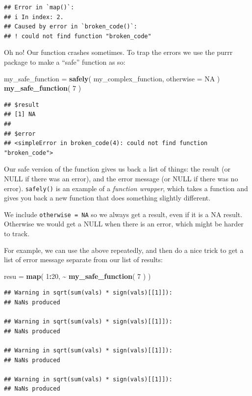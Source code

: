 \documentclass[
]{book}
\newenvironment{Shaded}{\begin{snugshade}}{\end{snugshade}}
\newcommand{\AttributeTok}[1]{\textcolor[rgb]{0.13,0.29,0.53}{#1}}
\newcommand{\ConstantTok}[1]{\textcolor[rgb]{0.56,0.35,0.01}{#1}}
\newcommand{\DecValTok}[1]{\textcolor[rgb]{0.00,0.00,0.81}{#1}}
\newcommand{\FunctionTok}[1]{\textcolor[rgb]{0.13,0.29,0.53}{\textbf{#1}}}
\newcommand{\NormalTok}[1]{#1}
\newcommand{\OtherTok}[1]{\textcolor[rgb]{0.56,0.35,0.01}{#1}}
\newcommand{\SpecialCharTok}[1]{\textcolor[rgb]{0.81,0.36,0.00}{\textbf{#1}}}
\begin{document}
\begin{verbatim}
## Error in `map()`:
## i In index: 2.
## Caused by error in `broken_code()`:
## ! could not find function "broken_code"
\end{verbatim}

Oh no! Our function crashes sometimes.
To trap the errors we use the purrr package to make a ``safe'' function as so:

\begin{Shaded}
\begin{Highlighting}[]
\NormalTok{my\_safe\_function }\OtherTok{=} \FunctionTok{safely}\NormalTok{( my\_complex\_function,}
                           \AttributeTok{otherwise =} \ConstantTok{NA}\NormalTok{ )}
\FunctionTok{my\_safe\_function}\NormalTok{( }\DecValTok{7}\NormalTok{ )}
\end{Highlighting}
\end{Shaded}

\begin{verbatim}
## $result
## [1] NA
## 
## $error
## <simpleError in broken_code(4): could not find function "broken_code">
\end{verbatim}

Our safe version of the function gives us back a list of things: the result (or NULL if there was an error), and the error message (or NULL if there was no error).
\texttt{safely()} is an example of a \emph{function wrapper}, which takes a function and gives you back a new function that does something slightly different.

We include \texttt{otherwise\ =\ NA} so we always get a result, even if it is a NA result. Otherwise we would get a NULL when there is an error, which might be harder to track.

For example, we can use the above repeatedly, and then do a nice trick to get a list of error message separate from our list of results:

\begin{Shaded}
\begin{Highlighting}[]
\NormalTok{resu }\OtherTok{=} \FunctionTok{map}\NormalTok{( }\DecValTok{1}\SpecialCharTok{:}\DecValTok{20}\NormalTok{, }\SpecialCharTok{\textasciitilde{}} \FunctionTok{my\_safe\_function}\NormalTok{( }\DecValTok{7}\NormalTok{ ) )}
\end{Highlighting}
\end{Shaded}

\begin{verbatim}
## Warning in sqrt(sum(vals) * sign(vals)[[1]]):
## NaNs produced

## Warning in sqrt(sum(vals) * sign(vals)[[1]]):
## NaNs produced

## Warning in sqrt(sum(vals) * sign(vals)[[1]]):
## NaNs produced

## Warning in sqrt(sum(vals) * sign(vals)[[1]]):
## NaNs produced
\end{verbatim}
\end{document}

